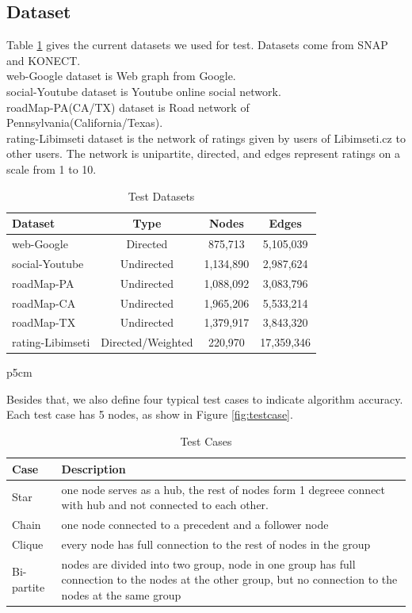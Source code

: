 \subsection{Dataset}
Table \ref{tab:datasets} gives the current datasets we used for test. Datasets come from SNAP and KONECT.\\ 
web-Google dataset is Web graph from Google. \\
social-Youtube dataset is Youtube online social network. \\
roadMap-PA(CA/TX) dataset is Road network of Pennsylvania(California/Texas). \\
rating-Libimseti dataset is the network of ratings given by users of Libimseti.cz to other users. The network is unipartite, directed, and edges represent ratings on a scale from 1 to 10. 
\begin{table}[htbf]
\begin{center} 
\begin{tabular}{|l | c | c | c } \hline \hline 
Dataset & Type & Nodes & Edges \\ \hline
web-Google & Directed & 875,713 & 5,105,039 \\
social-Youtube & Undirected & 1,134,890 & 2,987,624 \\
roadMap-PA & Undirected & 1,088,092 & 3,083,796 \\
roadMap-CA & Undirected & 1,965,206 & 5,533,214 \\
roadMap-TX & Undirected & 1,379,917 & 3,843,320 \\
rating-Libimseti & Directed/Weighted & 220,970 & 17,359,346 \\ \hline
\end{tabular} 
\end{center} 
\caption{Test Datasets}
\label{tab:datasets} 
 \end{table}p{5cm}
 
 Besides that, we also define four typical test cases to indicate algorithm accuracy. \\
 Each test case has 5 nodes, as show in Figure \ref{fig:testcase}.
\begin{table}[htbf]
\begin{center} 
\begin{tabular}{|l | p{5cm} | } \hline \hline 
Case & Description \\ \hline
Star & one node serves as a hub, the rest of nodes form 1 degreee connect with hub and not connected to each other.\\
Chain & one node connected to a precedent and a follower node \\
Clique & every node has full connection to the rest of nodes in the group \\
Bi-partite& nodes are divided into two group, node in one group has full connection to the nodes at the other group,  but no connection to the nodes at the same group\\ \hline
\end{tabular} 
\end{center} 
\caption{Test Cases}
\label{tab:cases} 
 \end{table}

